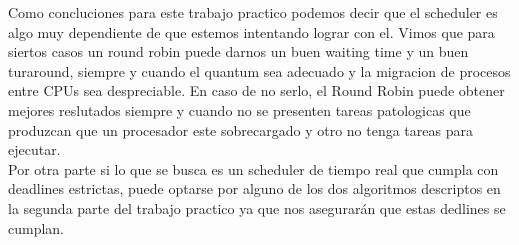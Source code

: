 Como concluciones para este trabajo practico podemos decir que el scheduler es algo muy dependiente de que estemos intentando lograr con el. Vimos que para siertos casos un round robin puede darnos un buen waiting time y un buen turaround, siempre y cuando el quantum sea adecuado y la migracion de procesos entre CPUs sea despreciable. En caso de no serlo, el Round Robin puede obtener mejores reslutados siempre y cuando no se presenten tareas patologicas que produzcan que un procesador este sobrecargado y otro no tenga tareas para ejecutar.
\\
Por otra parte si lo que se busca es un scheduler de tiempo real que cumpla con deadlines estrictas, puede optarse por alguno de los dos algoritmos descriptos en la segunda parte del trabajo practico ya que nos asegurarán que estas dedlines se cumplan.
